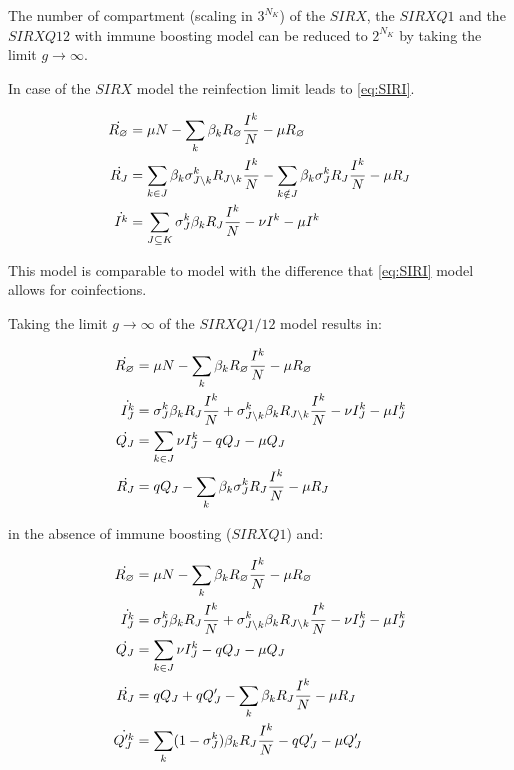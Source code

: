 The number of compartment (scaling in $3^{N_K}$) of the $SIRX$, the
$SIRXQ1$ and the $SIRXQ12$ with immune boosting model can be reduced
to $2^{N_K}$ by taking the limit $g \to \infty$.

In case of the $SIRX$ model the reinfection limit leads to
\eqref{eq:SIRI}.

\begin{align}
  \label{eq:SIRI}
  \dot{R_\varnothing} &= \mu N -\sum_k \beta_k R_\varnothing \frac{I^k}{N} - \mu R_\varnothing\\
  \dot{R_J} &= \sum_{k \in J} \beta_k \sigma^k_{J \setminus k} R_{J
    \setminus k} \frac{I^k}{N} - \sum_{k \notin J} \beta_k \sigma^k_J R_J \frac{I^k}{N} -\mu R_J \notag \\
  \dot{I^k} &= \sum_{J \subseteq K} \sigma^k_J \beta_k
  R_J \frac{I^k}{N} -\nu I^k -\mu I^k \notag
\end{align}

This model is comparable to \cite{Goekaydin2007} model with the
difference that \eqref{eq:SIRI} model allows for coinfections.

Taking the limit $g \to \infty$ of the $SIRXQ1/12$ model results in:

\begin{align}
  \label{eq:SIRIQ}
  \dot{R_\varnothing} &= \mu N -\sum_k \beta_k R_\varnothing \frac{I^k}{N} - \mu R_\varnothing\\
  \dot{I^k_J} &= \sigma^k_J \beta_k
  R_J \frac{I^k}{N} + \sigma^k_{J \setminus k} \beta_k
  R_{J \setminus k} \frac{I^k}{N} -\nu I^k_J -\mu I^k_J \notag \\
  \dot{Q_J} &= \sum_{k \in J} \nu I^k_J -q Q_J -\mu Q_J \notag \\
  \dot{R_J} &=  q Q_J - \sum_{k} \beta_k \sigma^k_J R_J \frac{I^k}{N} -\mu R_J \notag
\end{align}

in the absence of immune boosting ($SIRXQ1$) and:

\begin{align}
  \label{eq:SIRIQferg}
  \dot{R_\varnothing} &= \mu N -\sum_k \beta_k R_\varnothing \frac{I^k}{N} - \mu R_\varnothing\\
  \dot{I^k_J} &= \sigma^k_J \beta_k
  R_J \frac{I^k}{N} + \sigma^k_{J \setminus k} \beta_k
  R_{J \setminus k} \frac{I^k}{N} -\nu I^k_J -\mu I^k_J \notag \\
  \dot{Q_J} &= \sum_{k \in J} \nu I^k_J -q Q_J -\mu Q_J \notag \\
  \dot{R_J} &=  q Q_J + q Q'_J -\sum_{k} \beta_k R_J \frac{I^k}{N} -\mu R_J \notag \\
  \dot{Q'^k_J} &= \sum_{k} (1 - \sigma^k_J) \beta_k R_J \frac{I^k}{N}  -q Q'_J -\mu Q'_J \notag
\end{align}

